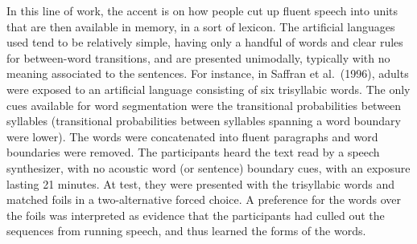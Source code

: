 \documentclass[
  american,
  ,man,floatsintext]{apa6}
\begin{document}
In this line of work, the accent is on how people cut up fluent speech into units that are then available in memory, in a sort of lexicon. The artificial languages used tend to be relatively simple, having only a handful of words and clear rules for between-word transitions, and are presented unimodally, typically with no meaning associated to the sentences. For instance, in Saffran et al.~(1996), adults were exposed to an artificial language consisting of six trisyllabic words. The only cues available for word segmentation were the transitional probabilities between syllables (transitional probabilities between syllables spanning a word boundary were lower). The words were concatenated into fluent paragraphs and word boundaries were removed. The participants heard the text read by a speech synthesizer, with no acoustic word (or sentence) boundary cues, with an exposure lasting 21 minutes. At test, they were presented with the trisyllabic words and matched foils in a two-alternative forced choice. A preference for the words over the foils was interpreted as evidence that the participants had culled out the sequences from running speech, and thus learned the forms of the words.
\end{document}
